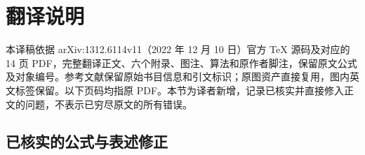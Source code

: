 \clearpage
\section*{翻译说明}
\label{translation:notes}
本译稿依据 arXiv:1312.6114v11（2022 年 12 月 10 日）官方 TeX 源码及对应的 14 页 PDF，完整翻译正文、六个附录、图注、算法和原作者脚注，保留原文公式及对象编号。参考文献保留原始书目信息和引文标识；原图资产直接复用，图内英文标签保留。以下页码均指原 PDF。本节为译者新增，记录已核实并直接修入正文的问题，不表示已穷尽原文的所有错误。

\subsection*{已核实的公式与表述修正}
